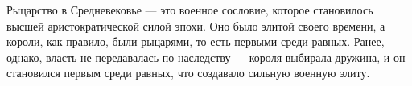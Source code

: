 
Рыцарство в Средневековье — это военное сословие, которое становилось высшей аристократической силой эпохи. Оно было элитой своего времени, а короли, как правило, были рыцарями, то есть первыми среди равных. Ранее, однако, власть не передавалась по наследству — короля выбирала дружина, и он становился первым среди равных, что создавало сильную военную элиту.

